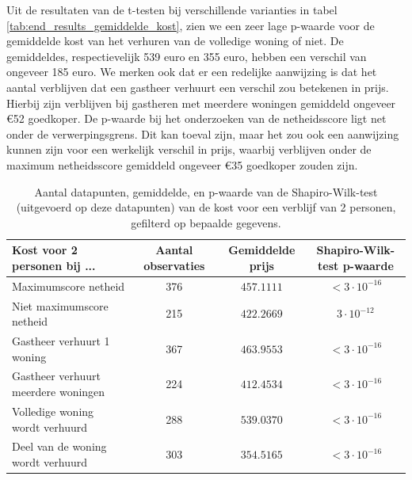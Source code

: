 \documentclass[a4paper]{kulakarticle}
\begin{document}
	Uit de resultaten van de t-testen bij verschillende varianties in tabel \ref{tab:end_results_gemiddelde_kost}, zien we een zeer lage p-waarde voor de gemiddelde kost van het verhuren van de volledige woning of niet. De gemiddeldes, respectievelijk 539 euro en 355 euro, hebben een verschil van ongeveer 185 euro. We merken ook dat er een redelijke aanwijzing is dat het aantal verblijven dat een gastheer verhuurt een verschil zou betekenen in prijs. Hierbij zijn verblijven bij gastheren met meerdere woningen gemiddeld ongeveer €52 goedkoper.
	De p-waarde bij het onderzoeken van de netheidsscore ligt net onder de verwerpingsgrens. Dit kan toeval zijn, maar het zou ook een aanwijzing kunnen zijn voor een werkelijk verschil in prijs, waarbij verblijven onder de maximum netheidsscore gemiddeld ongeveer €35 goedkoper zouden zijn.
	
	\begin{table}
		\caption{Aantal datapunten, gemiddelde, en p-waarde van de Shapiro-Wilk-test (uitgevoerd op deze datapunten) van de kost voor een verblijf van 2 personen, gefilterd op bepaalde gegevens.}
		\label{tab:intermediary_results_gemiddelde_kost}
		\begin{tabular}{|l*{3}{|c}|}
			\hline
			Kost voor 2 personen bij ...        & Aantal observaties & Gemiddelde prijs & Shapiro-Wilk-test p-waarde \\ \hline
			\hline
			Maximumscore netheid                & 376    & $457.1111$ & $< 3 \cdot 10^{-16}$ \\ \hline
			Niet maximumscore netheid           & 215    & $422.2669$ & $ 3 \cdot 10^{-12}$ \\ \hline
			Gastheer verhuurt 1 woning          & 367    & $463.9553$ & $< 3 \cdot 10^{-16}$ \\ \hline
			Gastheer verhuurt meerdere woningen & 224    & $412.4534$ & $< 3 \cdot 10^{-16}$ \\ \hline
			Volledige woning wordt verhuurd     & 288    & $539.0370$ & $< 3 \cdot 10^{-16}$ \\ \hline
			Deel van de woning wordt verhuurd   & 303    & $354.5165$ & $< 3 \cdot 10^{-16}$ \\ \hline
		\end{tabular}
	\end{table}
\end{document}
